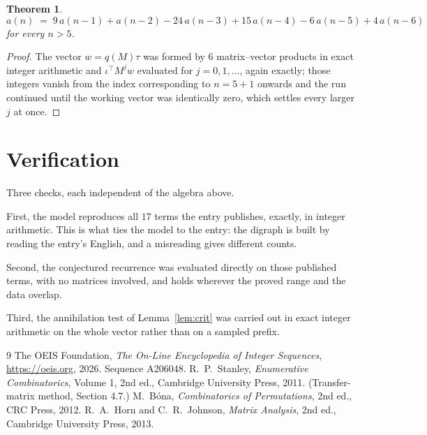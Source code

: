 \documentclass[11pt,a4paper]{article}
\theoremstyle{plain}
\newtheorem{theorem}{Theorem}
\theoremstyle{definition}
\begin{document}
\begin{theorem}
\[
a(n)\;=\;9\,a(n-1) + a(n-2) - 24\,a(n-3) + 15\,a(n-4) - 6\,a(n-5) + 4\,a(n-6)
\]
for every $n>5$.
\end{theorem}

\begin{proof}
The vector $w=q(M)\tau$ was formed by $6$ matrix--vector products in exact integer
arithmetic and $\iota^{\!\top}M^{j}w$ evaluated for $j=0,1,\dots$, again exactly; those
integers vanish from the index corresponding to $n=5+1$ onwards and the run continued
until the working vector was identically zero, which settles every larger $j$ at once.
\end{proof}

\section{Verification}

Three checks, each independent of the algebra above.

First, the model reproduces all $17$ terms the entry publishes, exactly, in integer
arithmetic. This is what ties the model to the entry: the digraph is built by reading the
entry's English, and a misreading gives different counts.

Second, the conjectured recurrence was evaluated directly on those published terms, with no
matrices involved, and holds wherever the proved range and the data overlap.

Third, the annihilation test of Lemma~\ref{lem:crit} was carried out in exact integer
arithmetic on the whole vector rather than on a sampled prefix.

\begin{thebibliography}{9}
 The OEIS Foundation, \emph{The On-Line Encyclopedia of Integer
Sequences}, \url{https://oeis.org}, 2026. Sequence A206048.
 R.~P.~Stanley, \emph{Enumerative Combinatorics}, Volume 1, 2nd ed.,
Cambridge University Press, 2011. (Transfer-matrix method, Section 4.7.)
 M.~B\'ona, \emph{Combinatorics of Permutations}, 2nd ed., CRC
Press, 2012.
 R.~A.~Horn and C.~R.~Johnson, \emph{Matrix Analysis}, 2nd ed., Cambridge
University Press, 2013.
\end{thebibliography}
\end{document}
